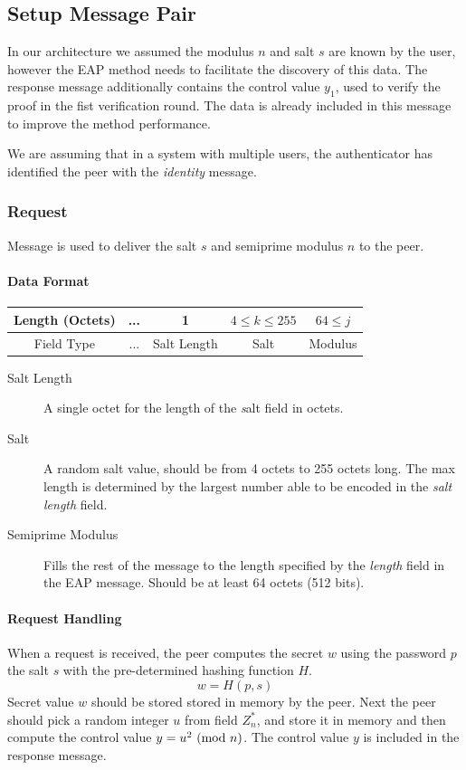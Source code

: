 \subsection{Setup Message Pair}
In our architecture we assumed the modulus $n$ and salt $s$ are known by the user, however the EAP method needs to facilitate the discovery of this data.
The response message additionally contains the control value $y_1$, used to verify the proof in the fist verification round. The data is already included in this message to improve the method performance.

We are assuming that in a system with multiple users, the authenticator has identified the peer with the \textit{identity} message.

\subsubsection{Request} Message is used to deliver the salt $s$ and semiprime modulus $n$ to the peer.

\paragraph{Data Format}

\begin{center}
\begin{tabular}{|c|c|c|c|c|}
	\hline
	Length (Octets) & ... & 1 & $4 \le k \le 255 $ & $64 \le j$\\
	\hline
	Field Type & ... & Salt Length & Salt & Modulus\\
	\hline
\end{tabular}
\end{center}

\begin{description}
	\item[Salt Length] A single octet for the length of the \textit salt field in octets.
	\item[Salt] A random salt value, should be from 4 octets to 255 octets long.
The max length is determined by the largest number able to be encoded in the \textit {salt length} field.
	\item[Semiprime Modulus] Fills the rest of the message to the length specified by the \textit{length} field in the EAP message. 
Should be at least 64 octets (512 bits).
\end{description}

\paragraph{Request Handling} When a request is received, the peer computes the secret $w$ using the password $p$ the salt $s$ with the pre-determined hashing function $H$.
$$w = H(p, s)$$
Secret value $w$ should be stored stored in memory by the peer. 
Next the peer should pick a random integer $u$ from field $Z^*_n$, and store it in memory and then compute the control value $y = u^2 \ (\mathrm{mod}\ n)$.
The control value $y$ is included in the response message.

